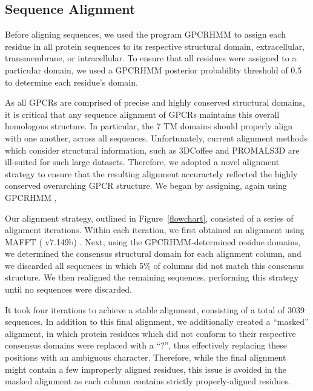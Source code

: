 \documentclass[fleqn,10pt]{wlpeerj}
\begin{document}
\subsection*{Sequence Alignment}
Before aligning sequences, we used the program GPCRHMM \citep{Wistrand2006} to assign each residue in all protein sequences to its respective structural domain, extracellular, transmembrane, or intracellular. To ensure that all residues were assigned to a particular domain, we used a GPCRHMM posterior probability threshold of $0.5$ to determine each residue's domain. 

As all GPCRs are comprised of precise and highly conserved structural domains, it is critical that any sequence alignment of GPCRs maintains this overall homologous structure. In particular, the 7 TM domains should properly align with one another, across all sequences. Unfortunately, current alignment methods which consider structural information, such as 3DCoffee \citep{3dcoffee} and PROMALS3D \citep{promals3d} are ill-suited for such large datasets. Therefore, we adopted a novel alignment strategy to ensure that the resulting alignment accuractely reflected the highly conserved overarching GPCR structure. We began by assigning, again using GPCRHMM \citep{Wistrand2006}, 

Our alignment strategy, outlined in Figure~\ref{flowchart}, consisted of a series of alignment iterations. Within each iteration, we first obtained an alignment using MAFFT ( v7.149b) \cite{mafftv7}. Next, using the GPCRHMM-determined residue domains, we determined the consensus structural domain for each alignment column, and we discarded all sequences in which 5\% of columns did not match this consensus structure. We then realigned the remaining sequences, performing this strategy until no sequences were discarded.

It took four iterations to achieve a stable alignment, consisting of a total of 3039 sequences. In addition to this final alignment, we additionally created a ``masked'' alignment, in which protein residues which did not conform to their respective consensus domains were replaced with a ``?'', thus effectively replacing these positions with an ambiguous character. Therefore, while the final alignment might contain a few improperly aligned residues, this issue is avoided in the masked alignment as each column contains strictly properly-aligned residues.  
\end{document}

